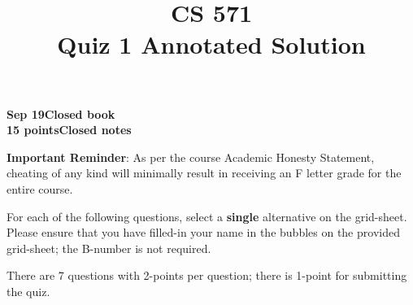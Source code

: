 \documentclass[12pt]{article}
\title{CS 571\\Quiz 1 Annotated Solution}
\date{}
\begin{document}
\maketitle

\begin{flushleft}
\textbf{Sep 19}\hfill\textbf{Closed book}\\
\textbf{15 points}\hfill\textbf{Closed notes}\\

\vspace{0.5cm}

\textbf{Important Reminder}: As per the course Academic Honesty
Statement, cheating of any kind will minimally result in receiving an
F letter grade for the entire course.


\end{flushleft}

For each of the following questions, select a \textbf{single}
alternative on the grid-sheet.  Please ensure that you have filled-in
your name in the bubbles on the provided grid-sheet; the B-number is
not required.

There are 7 questions with 2-points per question; there is 1-point
for submitting the quiz.
\end{document}
